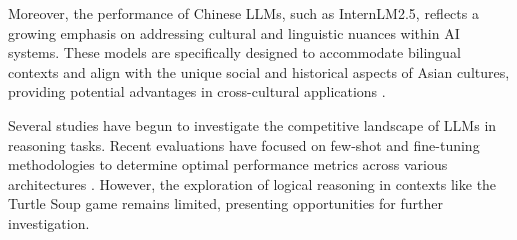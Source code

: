 
Moreover, the performance of Chinese LLMs, such as InternLM2.5, reflects a growing emphasis on addressing cultural and linguistic nuances within AI systems. These models are specifically designed to accommodate bilingual contexts and align with the unique social and historical aspects of Asian cultures, providing potential advantages in cross-cultural applications \cite{zhang2024mme}.

Several studies have begun to investigate the competitive landscape of LLMs in reasoning tasks. Recent evaluations have focused on few-shot and fine-tuning methodologies to determine optimal performance metrics across various architectures \cite{winata2021language}. However, the exploration of logical reasoning in contexts like the Turtle Soup game remains limited, presenting opportunities for further investigation.

